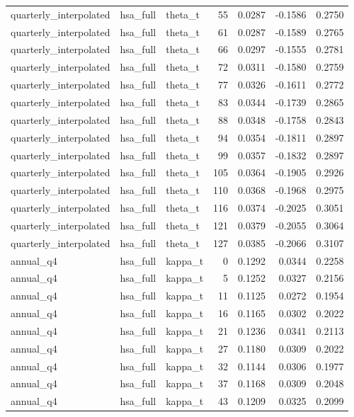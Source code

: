 \begin{tabular}{lllrrrr}
quarterly\_interpolated & hsa\_full & theta\_t & 55 & 0.0287 & -0.1586 & 0.2750 \\
quarterly\_interpolated & hsa\_full & theta\_t & 61 & 0.0287 & -0.1589 & 0.2765 \\
quarterly\_interpolated & hsa\_full & theta\_t & 66 & 0.0297 & -0.1555 & 0.2781 \\
quarterly\_interpolated & hsa\_full & theta\_t & 72 & 0.0311 & -0.1580 & 0.2759 \\
quarterly\_interpolated & hsa\_full & theta\_t & 77 & 0.0326 & -0.1611 & 0.2772 \\
quarterly\_interpolated & hsa\_full & theta\_t & 83 & 0.0344 & -0.1739 & 0.2865 \\
quarterly\_interpolated & hsa\_full & theta\_t & 88 & 0.0348 & -0.1758 & 0.2843 \\
quarterly\_interpolated & hsa\_full & theta\_t & 94 & 0.0354 & -0.1811 & 0.2897 \\
quarterly\_interpolated & hsa\_full & theta\_t & 99 & 0.0357 & -0.1832 & 0.2897 \\
quarterly\_interpolated & hsa\_full & theta\_t & 105 & 0.0364 & -0.1905 & 0.2926 \\
quarterly\_interpolated & hsa\_full & theta\_t & 110 & 0.0368 & -0.1968 & 0.2975 \\
quarterly\_interpolated & hsa\_full & theta\_t & 116 & 0.0374 & -0.2025 & 0.3051 \\
quarterly\_interpolated & hsa\_full & theta\_t & 121 & 0.0379 & -0.2055 & 0.3064 \\
quarterly\_interpolated & hsa\_full & theta\_t & 127 & 0.0385 & -0.2066 & 0.3107 \\
annual\_q4 & hsa\_full & kappa\_t & 0 & 0.1292 & 0.0344 & 0.2258 \\
annual\_q4 & hsa\_full & kappa\_t & 5 & 0.1252 & 0.0327 & 0.2156 \\
annual\_q4 & hsa\_full & kappa\_t & 11 & 0.1125 & 0.0272 & 0.1954 \\
annual\_q4 & hsa\_full & kappa\_t & 16 & 0.1165 & 0.0302 & 0.2022 \\
annual\_q4 & hsa\_full & kappa\_t & 21 & 0.1236 & 0.0341 & 0.2113 \\
annual\_q4 & hsa\_full & kappa\_t & 27 & 0.1180 & 0.0309 & 0.2022 \\
annual\_q4 & hsa\_full & kappa\_t & 32 & 0.1144 & 0.0306 & 0.1977 \\
annual\_q4 & hsa\_full & kappa\_t & 37 & 0.1168 & 0.0309 & 0.2048 \\
annual\_q4 & hsa\_full & kappa\_t & 43 & 0.1209 & 0.0325 & 0.2099 \\

\end{tabular}
